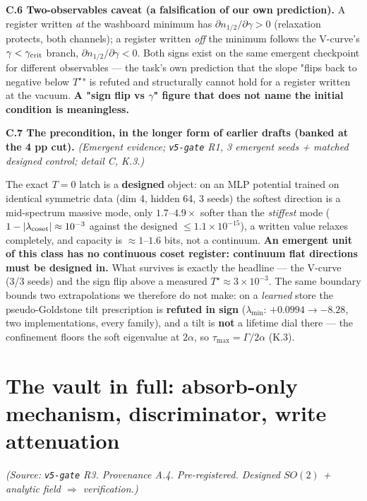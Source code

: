\documentclass{article}
\begin{document}
\textbf{C.6 Two-observables caveat (a falsification of our own prediction).} A register written \emph{at} the washboard minimum has $\partial n_{1/2}/\partial\gamma>0$ (relaxation protects, both channels); a register written \emph{off} the minimum follows the V-curve's $\gamma<\gamma_{\rm crit}$ branch, $\partial n_{1/2}/\partial\gamma<0$. Both signs exist on the same emergent checkpoint for different observables --- the task's own prediction that the slope "flips back to negative below $T^\star$" is refuted and structurally cannot hold for a register written at the vacuum. \textbf{A "sign flip vs $\gamma$" figure that does not name the initial condition is meaningless.}


\textbf{C.7 The precondition, in the longer form of earlier drafts (banked at the 4 pp cut).}
\emph{(Emergent evidence; \texttt{v5-gate} R1, 3 emergent seeds + matched designed control; detail C, K.3.)}

The exact $T=0$ latch is a \textbf{designed} object: on an MLP potential trained on identical symmetric data (dim 4, hidden 64, 3 seeds) the softest direction is a mid-spectrum massive mode, only $1.7$--$4.9\times$ softer than the \emph{stiffest} mode ($1-|\lambda_{\rm coset}|\approx10^{-3}$ against the designed $\le1.1\times10^{-15}$), a written value relaxes completely, and capacity is $\approx1$--$1.6$ bits, not a continuum. \textbf{An emergent unit of this class has no continuous coset register: continuum flat directions must be designed in.} What survives is exactly the headline --- the V-curve (3/3 seeds) and the sign flip above a measured $T^\star\approx3\times10^{-3}$. The same boundary bounds two extrapolations we therefore do not make: on a \emph{learned} store the pseudo-Goldstone tilt prescription is \textbf{refuted in sign} ($\lambda_{\min}$: $+0.0994\to-8.28$, two implementations, every family), and a tilt is \textbf{not} a lifetime dial there --- the confinement floors the soft eigenvalue at $2\alpha$, so $\tau_{\max}=\Gamma/2\alpha$ (K.3).

\section{The vault in full: absorb-only mechanism, discriminator, write attenuation}

\emph{(Source: \texttt{v5-gate} R3. Provenance A.4. Pre-registered. Designed $SO(2)$ + analytic field $\Rightarrow$ verification.)}
\end{document}
